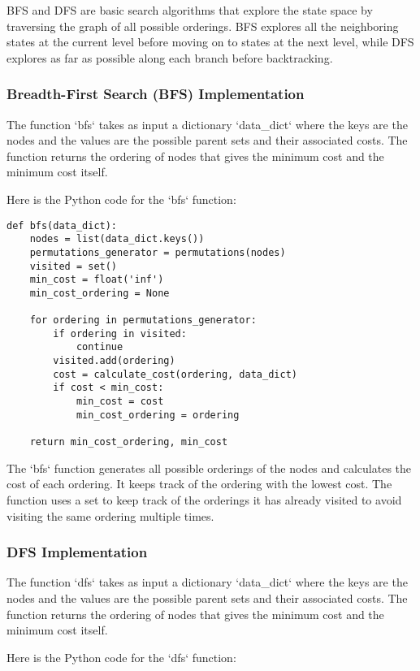 \documentclass{article}
\begin{document}
BFS and DFS are basic search algorithms that explore the state space by traversing the graph of all possible orderings. BFS explores all the neighboring states at the current level before moving on to states at the next level, while DFS explores as far as possible along each branch before backtracking.
\subsubsection{Breadth-First Search (BFS) Implementation}
The function `bfs` takes as input a dictionary `data\_dict` where the keys are the nodes and the values are the possible parent sets and their associated costs. The function returns the ordering of nodes that gives the minimum cost and the minimum cost itself.

Here is the Python code for the `bfs` function:

\begin{verbatim}
def bfs(data_dict):
    nodes = list(data_dict.keys())
    permutations_generator = permutations(nodes)
    visited = set()
    min_cost = float('inf')
    min_cost_ordering = None

    for ordering in permutations_generator:
        if ordering in visited:
            continue
        visited.add(ordering)
        cost = calculate_cost(ordering, data_dict)
        if cost < min_cost:
            min_cost = cost
            min_cost_ordering = ordering

    return min_cost_ordering, min_cost
\end{verbatim}

The `bfs` function generates all possible orderings of the nodes and calculates the cost of each ordering. It keeps track of the ordering with the lowest cost. The function uses a set to keep track of the orderings it has already visited to avoid visiting the same ordering multiple times.

\subsubsection{DFS Implementation}

The function `dfs` takes as input a dictionary `data\_dict` where the keys are the nodes and the values are the possible parent sets and their associated costs. The function returns the ordering of nodes that gives the minimum cost and the minimum cost itself.

Here is the Python code for the `dfs` function:
\end{document}
